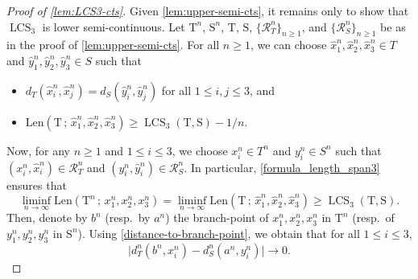\documentclass[11pt,reqno]{amsart}
\newcommand{\1}{\mathbf{1}}
\newcommand{\0}{\mathbf{0}}
\newcommand{\rT}{\mathrm{T}}
\newcommand{\rS}{\mathrm{S}}
\newcommand\cR{{\mathcal R}}
\newcommand{\LCS}{\operatorname{LCS}}
\begin{document}
\begin{proof}[Proof of \cref{lem:LCS3-cts}]
Given \cref{lem:upper-semi-cts}, it remains only to show that $\LCS_3$ is lower semi-continuous. Let $\rT^n$, $\rS^n$, $\rT$, $\rS$, $\{\cR_T^n\}_{n \geq 1}$, and $\{ \cR_S^n\}_{n \geq 1}$ be as in the proof of \cref{lem:upper-semi-cts}. 
For all $n\geq 1$, we can choose $\hat{x}_1^n,\hat{x}_2^n,\hat{x}_3^n\in T$ and $\hat{y}_1^n,\hat{y}_2^n,\hat{y}_3^n\in S$ such that
\begin{itemize}
    \item $d_T(\hat{x}_i^n,\hat{x}_j^n)=d_S(\hat{y}_i^n,\hat{y}_j^n)$ for all $1\leq i,j\leq 3$, and
    \item $\mathrm{Len}(\rT\, ;\, \hat{x}_1^n,\hat{x}_2^n,\hat{x}_3^n)\geq \LCS_3(\rT,\rS)-1/n$.
\end{itemize}

Now, for any $n\geq 1$ and $1\leq i\leq 3$, we choose $x_i^n\in T^n$ and $y_i^n\in S^n$ such that $(x_i^n,\hat{x}_i^n)\in\cR_T^n$ and $(y_i^n,\hat{y}_i^n)\in\cR_S^n$. In particular, \eqref{formula_length_span3} ensures that
\begin{equation}
\label{II_tool_final}
\liminf_{n\to\infty}\mathrm{Len}(\rT^n\, ;\, x_1^n,x_2^n,x_3^n) = \liminf_{n\to\infty} \mathrm{Len}(\rT \, ;\, \hat{x}_1^n,\hat{x}_2^n,\hat{x}_3^n)\geq \LCS_3(\rT,\rS).
\end{equation}
Then, denote by $b^n$ (resp.~by $a^n$) the branch-point of $x_1^n,x_2^n,x_3^n$ in $\rT^n$ (resp.~of $y_1^n,y_2^n,y_3^n$ in $\rS^n$). Using \eqref{distance-to-branch-point}, we obtain that for all $1\leq i\leq 3$,
\begin{equation}
\label{II_tool}
\big|d_T^n(b^n,x_i^n)-d_S^n(a^n,y_i^n)\big|\to 0.
\end{equation}


\end{proof}
\end{document}
